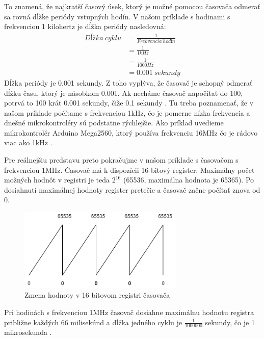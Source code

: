To znamená, že najkratší časový úsek, ktorý je možné pomocou časovača odmerať sa
rovná dĺžke periódy vstupných hodín. V našom príklade s hodinami s frekvenciou 1 kilohertz je dĺžka periódy nasledovná:
\begin{equation}
    \begin{aligned}
        Dĺžka\:cyklu & = \frac{1}{Frekvencia\:hodín} \\
                     & = \frac{1}{1kHz}              \\
                     & = \frac{1}{ 1000 Hz}          \\
                     & =  0.001\:sekundy
    \end{aligned}
\end{equation}
Dĺžka periódy je 0.001 sekundy. Z toho vyplýva, že časovač je schopný odmerať dĺžku času, ktorý je násobkom 0.001. Ak necháme časovač napočítať do 100, potrvá to 100 krát 0.001 sekundy, čiže 0.1 sekundy \cite{cameraNewbieGuideAVR2015}.
Tu treba poznamenať, že v našom príklade počítame s frekvenciou 1kHz, čo je pomerne nízka frekvencia a dnešné mikrokontroléry sú podstatne rýchlejšie.
Ako príklad uvedieme mikrokontrolér Arduino Mega2560, ktorý používa frekvenciu 16MHz čo je rádovo viac ako 1kHz \cite{ArduinoMega2560}.
\par Pre reálnejšiu predstavu preto pokračujme v našom príklade s časovačom s frekvenciou 1MHz. Časovač má k dispozícii 16-bitový register. Maximálny počet
možných hodnôt v registri je teda $2^{16}$ (65536, maximálna hodnota je 65365).
Po dosiahnutí maximálnej hodnoty register pretečie a časovač začne počítať znova od 0.
\begin{figure}[!h]
    \centering
    \includegraphics[width=0.70\textwidth]{img/timer.png}
    \caption{Zmena hodnoty v 16 bitovom registri časovača}
    \label{figure:timer1}
\end{figure}

Pri hodinách s frekvenciou 1MHz časovač dosiahne maximálnu hodnotu registra približne každých 66 milisekúnd a dĺžka jedného cyklu je $\frac{1}{1000000}$ sekundy, čo je 1 mikrosekunda \cite{cameraNewbieGuideAVR2015}.

